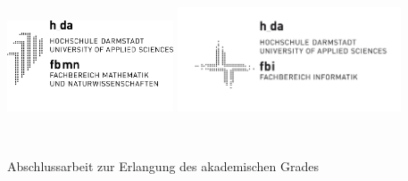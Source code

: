 \thispagestyle{empty}
\begin{titlepage}

  \condTWOSIDE{\changetext{}{19mm}{}{19mm}{}}

  \begin{center}
    \includegraphics[height=2.7cm]{gfx/logo_fbmn.png}
    \hspace{1.0cm}
    \includegraphics[height=3.1cm]{gfx/logofbi_de.png} \\ 
  \end{center}
  
  \vspace{1.1cm}

  \begin{center}
    \vspace{0.1cm}
    \huge \textbf{\myUni}\\
    \vspace{0.1cm}
    \LARGE \myFaculty
  \end{center}

  \vfill
  \vfill

  \begin{center}
    \LARGE \textbf{\myTitle}
  \end{center} 

  \vfill
  \vfill

  \begin{center}
    \Large Abschlussarbeit zur Erlangung des akademischen Grades\\
    \vspace{0.3cm}
    \Large \myDegree
  \end{center}

  \vfill


\end{titlepage}
